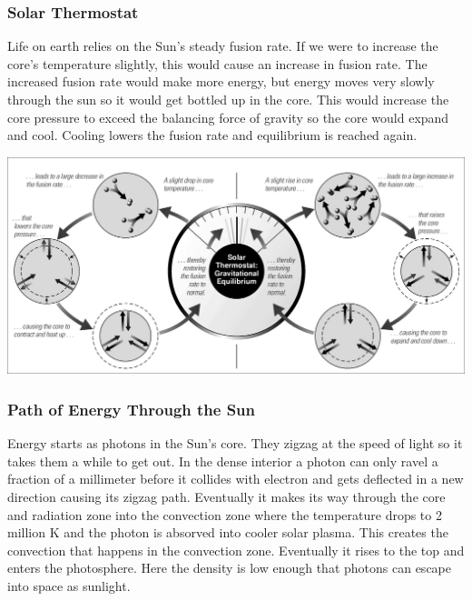\subsubsection{Solar Thermostat}
Life on earth relies on the Sun's steady fusion rate. If we were to increase the core's temperature slightly, this would cause an increase in fusion rate. The increased fusion rate would make more energy, but energy moves very slowly through the sun so it would get bottled up in the core. This would increase the core pressure to exceed the balancing force of gravity so the core would expand and cool. Cooling lowers the fusion rate and equilibrium is reached again.

\includegraphics[scale=0.5]{solarThermostat}

\subsubsection{Path of Energy Through the Sun}
Energy starts as photons in the Sun's core. They zigzag at the speed of light so it takes them a while to get out. In the dense interior a photon can only ravel a fraction of a millimeter before it collides with electron and gets deflected in a new direction causing its zigzag path. Eventually it makes its way through the core and radiation zone into the convection zone where the temperature drops to 2 million K and the photon is absorved into cooler solar plasma. This creates the convection that happens in the convection zone. Eventually it rises to the top and enters the photosphere. Here the density is low enough that photons can escape into space as sunlight.

